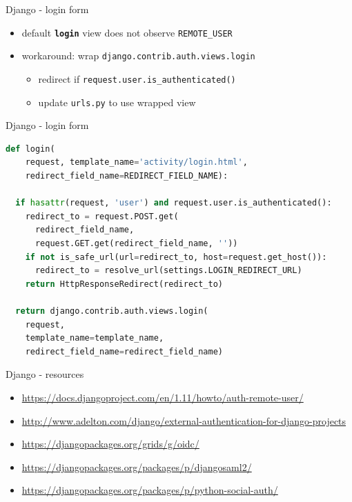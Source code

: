 \documentclass[ignorenonframetext,aspectratio=169]{beamer}
\providecommand{\tightlist}{%
  \setlength{\itemsep}{0pt}\setlength{\parskip}{0pt}}
\begin{document}
\begin{frame}{Django - login form}
\begin{itemize}
\tightlist

\item default {\tt \textbf{login}} view does not observe {\tt REMOTE\_USER}

\item workaround: wrap {\tt django.contrib.auth.views.login}

    \begin{itemize}
    \tightlist
    \item redirect if {\tt request.user.is\_authenticated()}
    \item update {\tt urls.py} to use wrapped view
    \end{itemize}

\end{itemize}
\end{frame}

\begin{frame}[fragile]{Django - login form}
\begin{lstlisting}[language=Python]
def login(
    request, template_name='activity/login.html',
    redirect_field_name=REDIRECT_FIELD_NAME):

  if hasattr(request, 'user') and request.user.is_authenticated():
    redirect_to = request.POST.get(
      redirect_field_name,
      request.GET.get(redirect_field_name, ''))
    if not is_safe_url(url=redirect_to, host=request.get_host()):
      redirect_to = resolve_url(settings.LOGIN_REDIRECT_URL)
    return HttpResponseRedirect(redirect_to)

  return django.contrib.auth.views.login(
    request,
    template_name=template_name,
    redirect_field_name=redirect_field_name)
\end{lstlisting}
\end{frame}

\begin{frame}{Django - resources}
\begin{itemize}
\tightlist

\item \url{https://docs.djangoproject.com/en/1.11/howto/auth-remote-user/}
\item \url{http://www.adelton.com/django/external-authentication-for-django-projects}
\item \url{https://djangopackages.org/grids/g/oidc/}
\item \url{https://djangopackages.org/packages/p/djangosaml2/}
\item \url{https://djangopackages.org/packages/p/python-social-auth/}

\end{itemize}
\end{frame}
\end{document}
